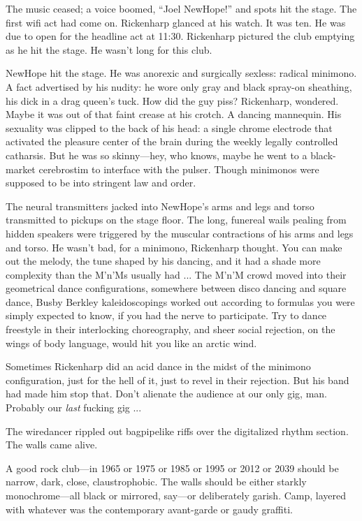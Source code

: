 The music ceased; a voice boomed, ``Joel NewHope!'' and spots hit the stage. The first wifi act had come on. Rickenharp glanced at his watch. It was ten. He was due to open for the headline act at 11:30. Rickenharp pictured the club emptying as he hit the stage. He wasn't long for this club.

NewHope hit the stage. He was anorexic and surgically sexless: radical minimono. A fact advertised by his nudity: he wore only gray and black spray-on sheathing, his dick in a drag queen's tuck. How did the guy piss? Rickenharp, wondered. Maybe it was out of that faint crease at his crotch. A dancing mannequin. His sexuality was clipped to the back of his head: a single chrome electrode that activated the pleasure center of the brain during the weekly legally controlled catharsis. But he was so skinny---hey, who knows, maybe he went to a black-market cerebrostim to interface with the pulser. Though minimonos were supposed to be into stringent law and order.

The neural transmitters jacked into NewHope's arms and legs and torso transmitted to pickups on the stage floor. The long, funereal wails pealing from hidden speakers were triggered by the muscular contractions of his arms and legs and torso. He wasn't bad, for a minimono, Rickenharp thought. You can make out the melody, the tune shaped by his dancing, and it had a shade more complexity than the M'n'Ms usually had ... The M'n'M crowd moved into their geometrical dance configurations, somewhere between disco dancing and square dance, Busby Berkley kaleidoscopings worked out according to formulas you were simply expected to know, if you had the nerve to participate. Try to dance freestyle in their interlocking choreography, and sheer social rejection, on the wings of body language, would hit you like an arctic wind.

Sometimes Rickenharp did an acid dance in the midst of the minimono configuration, just for the hell of it, just to revel in their rejection. But his band had made him stop that. Don't alienate the audience at our only gig, man. Probably our \textit{last} fucking gig ...

The wiredancer rippled out bagpipelike riffs over the digitalized rhythm section. The walls came alive.

A good rock club---in 1965 or 1975 or 1985 or 1995 or 2012 or 2039 should be narrow, dark, close, claustrophobic. The walls should be either starkly monochrome---all black or mirrored, say---or deliberately garish. Camp, layered with whatever was the contemporary avant-garde or gaudy graffiti.

